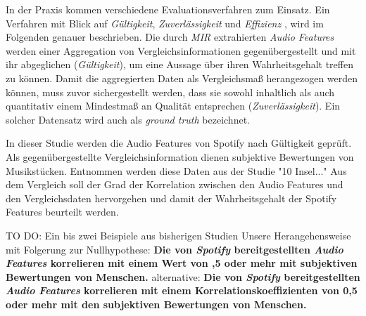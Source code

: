 In der Praxis kommen verschiedene Evaluationsverfahren zum Einsatz.
Ein Verfahren mit Blick auf \textit{Gültigkeit}, \textit{Zuverlässigkeit} und \textit{Effizienz} \cite{Downie2004}, wird im Folgenden genauer beschrieben.
Die durch \textit{MIR} extrahierten \textit{Audio Features} werden einer Aggregation von Vergleichsinformationen gegenübergestellt und mit ihr abgeglichen (\textit{Gültigkeit}), um eine Aussage über ihren Wahrheitsgehalt treffen zu können.
Damit die aggregierten Daten als Vergleichsmaß herangezogen werden können, muss zuvor sichergestellt werden, dass sie sowohl inhaltlich als auch quantitativ einem Mindestmaß an Qualität entsprechen (\textit{Zuverlässigkeit}).
Ein solcher Datensatz wird auch als \textit{ground truth} bezeichnet. 

In dieser Studie werden die Audio Features von Spotify nach Gültigkeit geprüft.
Als gegenübergestellte Vergleichsinformation dienen subjektive Bewertungen von Musikstücken. Entnommen werden diese Daten aus der Studie "10 Insel..."
Aus dem Vergleich soll der Grad der Korrelation zwischen den Audio Features und den Vergleichsdaten hervorgehen und damit der Wahrheitsgehalt der Spotify Features beurteilt werden.
       


TO DO:
Ein bis zwei Beispiele aus bisherigen Studien 
Unsere Herangehensweise mit Folgerung zur Nullhypothese:
\textbf{Die von \textit{Spotify} bereitgestellten \textit{Audio Features} korrelieren mit einem Wert von ,5 oder mehr mit subjektiven Bewertungen von Menschen.}
alternative: \textbf{Die von \textit{Spotify} bereitgestellten \textit{Audio Features} korrelieren mit einem Korrelationskoeffizienten von 0,5 oder mehr mit den subjektiven Bewertungen von Menschen.}
